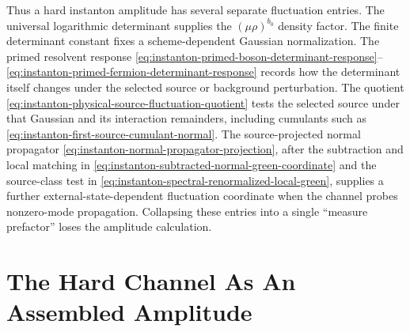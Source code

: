 Thus a hard instanton amplitude has several separate fluctuation entries.  The
universal logarithmic determinant supplies the \((\mu\rho)^{b_0}\) density
factor.  The finite determinant constant fixes a scheme-dependent Gaussian
normalization.  The primed resolvent response
\eqref{eq:instanton-primed-boson-determinant-response}--\eqref{eq:instanton-primed-fermion-determinant-response}
records how the determinant itself changes under the selected source or
background perturbation.  The quotient
\eqref{eq:instanton-physical-source-fluctuation-quotient} tests the selected
source under that Gaussian and its interaction remainders, including cumulants
such as \eqref{eq:instanton-first-source-cumulant-normal}.  The
source-projected normal propagator
\eqref{eq:instanton-normal-propagator-projection}, after the subtraction and
local matching in
\eqref{eq:instanton-subtracted-normal-green-coordinate} and the
source-class test in
\eqref{eq:instanton-spectral-renormalized-local-green}, supplies a further
external-state-dependent fluctuation coordinate when the channel probes
nonzero-mode propagation.  Collapsing these entries into a single ``measure
prefactor'' loses the amplitude calculation.

\section{The Hard Channel As An Assembled Amplitude}
\label{sec:instanton-hard-amplitude-assembly}

